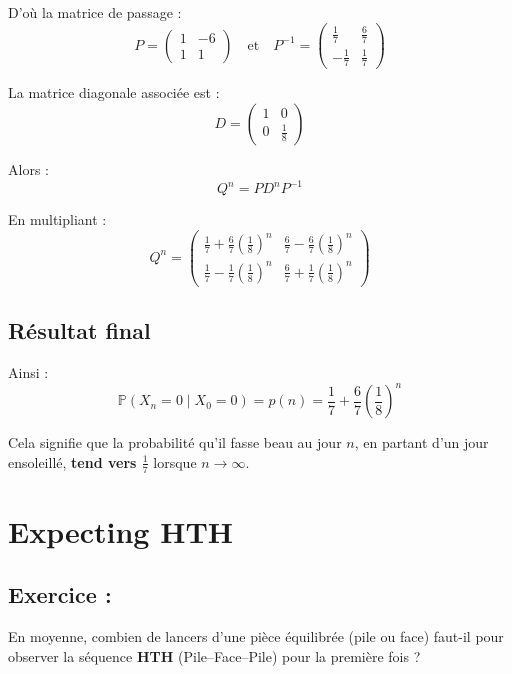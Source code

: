 D'où la matrice de passage :
\[
P = \begin{pmatrix} 1 & -6 \\ 1 & 1 \end{pmatrix}
\quad \text{et} \quad
P^{-1} = \begin{pmatrix} \frac{1}{7} & \frac{6}{7} \\ -\frac{1}{7} & \frac{1}{7} \end{pmatrix}
\]


La matrice diagonale associée est :
\[
D = \begin{pmatrix} 1 & 0 \\ 0 & \frac{1}{8} \end{pmatrix}
\]

Alors :
\[
Q^n = P D^n P^{-1}
\]

En multipliant :
\[
Q^n =
\begin{pmatrix}
\frac{1}{7} + \frac{6}{7}\left( \frac{1}{8} \right)^n & \frac{6}{7} - \frac{6}{7} \left( \frac{1}{8} \right)^n \\
\frac{1}{7} - \frac{1}{7} \left( \frac{1}{8} \right)^n & \frac{6}{7} + \frac{1}{7} \left( \frac{1}{8} \right)^n
\end{pmatrix}
\]

\subsection*{Résultat final}

Ainsi :
\[
\mathbb{P}(X_n = 0 \mid X_0 = 0) = p(n) = \frac{1}{7} + \frac{6}{7} \left( \frac{1}{8} \right)^n
\]

Cela signifie que la probabilité qu’il fasse beau au jour \( n \), en partant d’un jour ensoleillé, \textbf{tend vers \( \frac{1}{7} \)} lorsque \( n \to \infty \).

\section{Expecting HTH}

\subsection*{Exercice :}

\begin{exerciseBox}
En moyenne, combien de lancers d'une pièce équilibrée (pile ou face) faut-il pour observer la séquence \textbf{HTH} (Pile–Face–Pile) pour la première fois ?
\end{exerciseBox}

